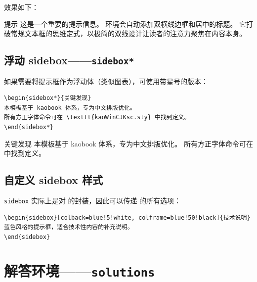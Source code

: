 效果如下：

\begin{sidebox}{提示}
这是一个重要的提示信息。 环境会自动添加双横线边框和居中的标题。
它打破常规文本框的思维定式，以极简的双线设计让读者的注意力聚焦在内容本身。
\end{sidebox}

\subsection{浮动 sidebox——\texttt{sidebox*}}

如果需要将提示框作为浮动体（类似图表），可使用带星号的版本：

\begin{lstlisting}
\begin{sidebox*}{关键发现}
本模板基于 kaobook 体系，专为中文排版优化。
所有方正字体命令可在 \texttt{kaoWinCJKsc.sty} 中找到定义。
\end{sidebox*}
\end{lstlisting}

\begin{sidebox*}{关键发现}
本模板基于 kaobook 体系，专为中文排版优化。
所有方正字体命令可在  中找到定义。
\end{sidebox*}

\subsection{自定义 sidebox 样式}

\texttt{sidebox} 实际上是对  的封装，因此可以传递
 的所有选项：

\begin{lstlisting}
\begin{sidebox}[colback=blue!5!white, colframe=blue!50!black]{技术说明}
蓝色风格的提示框，适合技术性内容的补充说明。
\end{sidebox}
\end{lstlisting}


\section{解答环境——\texttt{solutions}}


